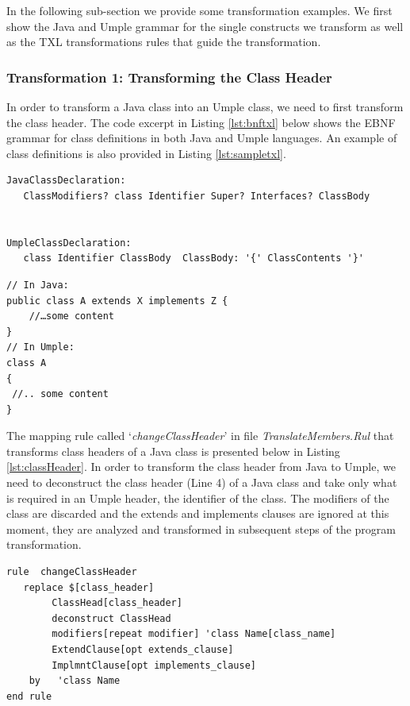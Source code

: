 In the following sub-section we provide some transformation examples. We first show the Java and Umple grammar for the single constructs we transform as well as the TXL transformations rules that guide the transformation.

\subsubsection{Transformation 1: Transforming the Class Header} 

In order to transform a Java class into an Umple class, we need to first transform the class header. The code excerpt in Listing \ref{lst:bnftxl} below shows the EBNF grammar for class definitions in both Java and Umple languages. An example of class definitions is also provided in Listing \ref{lst:sampletxl}.

\begin{lstlisting}[style=umplePlain, caption="Class definition grammar in BNF form", label=lst:bnftxl]
JavaClassDeclaration: 
   ClassModifiers? class Identifier Super? Interfaces? ClassBody


UmpleClassDeclaration: 
   class Identifier ClassBody  ClassBody: '{' ClassContents '}'

\end{lstlisting}

\begin{lstlisting}[style=umplePlain, caption=Class definitions in Java and Umple, label=lst:sampletxl]
// In Java:
public class A extends X implements Z {
    //…some content
}
// In Umple:
class A 
{	
 //.. some content
}
\end{lstlisting}

The mapping rule called `\textit{changeClassHeader}' in file \textit{TranslateMembers.Rul} that transforms class headers of a Java class is presented below in Listing \ref{lst:classHeader}. In order to transform the class header from Java to Umple, we need to deconstruct the class header  (Line 4)  of a Java class and take only what is required in an Umple header, the identifier of the class. The modifiers of the class are discarded and the extends and implements clauses are ignored at this moment, they are analyzed and transformed in subsequent steps of the program transformation. 

\begin{lstlisting}[style=umplePlain, caption=TXL mapping rule for transforming the class headers, label=lst:classHeader]
rule  changeClassHeader 	
   replace $[class_header] 		
    	ClassHead[class_header] 		
    	deconstruct ClassHead 					
    	modifiers[repeat modifier] 'class Name[class_name] 
        ExtendClause[opt extends_clause] 
        ImplmntClause[opt implements_clause]          
    by 	 'class Name 
end rule

\end{lstlisting}

